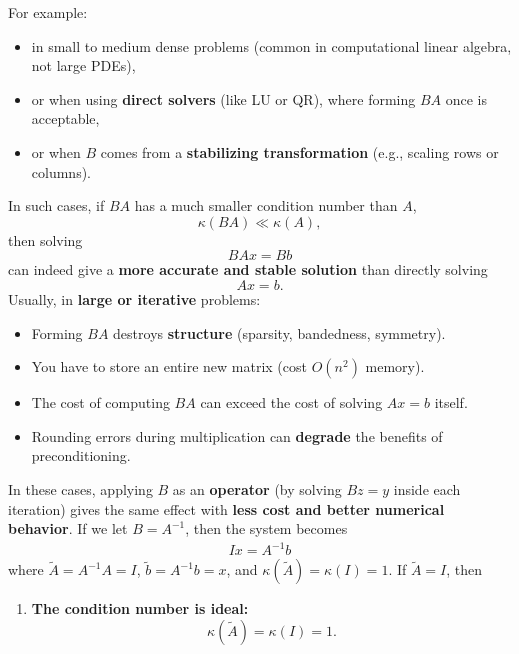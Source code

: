 \documentclass{report}
\begin{document}
\begin{itemize}
            \bigbreak \noindent 
            For example:
            \begin{itemize}
                \item in small to medium dense problems (common in computational linear algebra, not large PDEs),
                \item or when using \textbf{direct solvers} (like LU or QR), where forming $BA$ once is acceptable,
                \item or when $B$ comes from a \textbf{stabilizing transformation} (e.g., scaling rows or columns).
            \end{itemize}
            In such cases, if $BA$ has a much smaller condition number than $A$,
            \[
                \kappa(BA) \ll \kappa(A),
            \]
            then solving 
            \[
                BAx = Bb
            \]
            can indeed give a \textbf{more accurate and stable solution} than directly solving 
            \[
                Ax = b.
            \]
            Usually, in \textbf{large or iterative} problems:
            \begin{itemize}
                \item Forming $BA$ destroys \textbf{structure} (sparsity, bandedness, symmetry).
                \item You have to store an entire new matrix (cost $O(n^2)$ memory).
                \item The cost of computing $BA$ can exceed the cost of solving $Ax = b$ itself.
                \item Rounding errors during multiplication can \textbf{degrade} the benefits of preconditioning.
            \end{itemize}
            In these cases, applying $B$ as an \textbf{operator} (by solving $Bz = y$ inside each iteration)
            gives the same effect with \textbf{less cost and better numerical behavior}.
            \bigbreak \noindent 
            If we let $B = A^{-1}$, then the system becomes
            \begin{align*}
                Ix = A^{-1}b
            \end{align*}
            where  $\tilde{A} = A^{-1}A = I$, $\tilde{b} = A^{-1}b = x$, and $\kappa(\tilde{A}) = \kappa(I) = 1$. If $\tilde{A} = I$, then
            \begin{enumerate}
                \item \textbf{The condition number is ideal:}
                    \[
                        \kappa(\tilde{A}) = \kappa(I) = 1.
\]
\end{enumerate}
\end{itemize}
\end{document}
